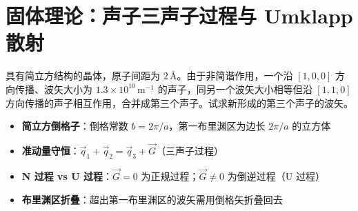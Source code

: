 \section{固体理论：声子三声子过程与 Umklapp 散射}
\label{sec:three-phonon-umklapp}

\begin{modelbox}[题目：简立方晶体中两个声子合并]
具有简立方结构的晶体，原子间距为 $2\,\text{\AA}$。由于非简谐作用，一个沿 $[1,0,0]$ 方向传播、波矢大小为 $1.3\times10^{10}\,\mathrm{m^{-1}}$ 的声子，同另一个波矢大小相等但沿 $[1,1,0]$ 方向传播的声子相互作用，合并成第三个声子。试求新形成的第三个声子的波矢。
\end{modelbox}

\begin{tipbox}[考点快速分析]
\begin{itemize}
    \item \textbf{简立方倒格子}：倒格常数 $b=2\pi/a$，第一布里渊区为边长 $2\pi/a$ 的立方体
    \item \textbf{准动量守恒}：$\vec q_1+\vec q_2=\vec q_3+\vec G$（三声子过程）
    \item \textbf{N 过程 vs U 过程}：$\vec G=0$ 为正规过程；$\vec G\neq0$ 为倒逆过程（U 过程）
    \item \textbf{布里渊区折叠}：超出第一布里渊区的波矢需用倒格矢折叠回去
\end{itemize}
\end{tipbox}


